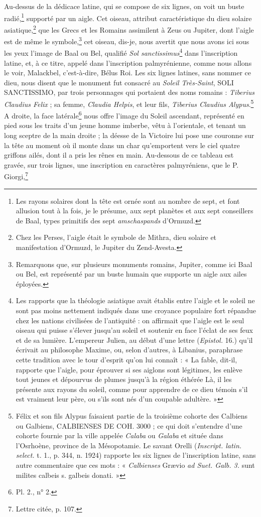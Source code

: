 \documentclass{article}
\begin{document}
Au-dessus de la dédicace latine, qui se compose de six lignes, on voit un buste radié,\footnote{Les rayons solaires dont la tête est ornée sont au nombre de sept, et font allusion tout à la fois, je le présume, aux sept planètes et aux sept conseillers de Baal, types primitifs des sept \emph{amschaspands} d'Ormuzd.} supporté par un aigle. Cet oiseau, attribut caractéristique du dieu solaire asiatique,\footnote{Chez les Perses, l'aigle était le symbole de Mithra, dieu solaire et manifestation d'Ormuzd, le Jupiter du Zend-Avesta.} que les Grecs et les Romains assimilent à Zeus ou Jupiter, dont l'aigle est de même le symbole,\footnote{Remarquons que, sur plusieurs monuments romains, Jupiter, comme ici Baal ou Bel, est représenté par un buste humain que supporte un aigle aux ailes éployées.} cet oiseau, dis-je, nous avertit que nous avons ici sous les yeux l'image de Baal ou Bel, qualifié \emph{Sol sanctissimus}\footnote{Les rapports que la théologie asiatique avait établis entre l'aigle et le soleil ne sont pas moins nettement indiqués dans une croyance populaire fort répandue chez les nations civilisées de l'antiquité : on affirmait que l'aigle est le seul oiseau qui puisse s'élever jusqu'au soleil et soutenir en face l'éclat de ses feux et de sa lumière. L'empereur Julien, au début d'une lettre (\emph{Epistol.} 16.) qu'il écrivait au philosophe Maxime, ou, selon d'autres, à Libanius, paraphrase cette tradition avec le tour d'esprit qu'on lui connaît : « La fable, dit-il, rapporte que l'aigle, pour éprouver si ses aiglons sont légitimes, les enlève tout jeunes et dépourvus de plumes jusqu'à la région éthérée Là, il les présente aux rayons du soleil, comme pour apprendre de ce dieu témoin s'il est vraiment leur père, ou s'ils sont nés d'un coupable adultère. »} dans l'inscription latine, et, à ce titre, appelé dans l'inscription palmyrénienne, comme nous allons le voir, Malackbel, c'est-à-dire, Bélus Roi. Les six lignes latines, sans nommer ce dieu, nous disent que le monument fut consacré au \emph{Soleil Très-Saint}, SOLI SANCTISSIMO, par trois personnages qui portaient des noms romains : \emph{Tiberius Claudius Felix} ; sa femme, \emph{Claudia Helpis}, et leur fils, \emph{Tiberius Claudius Alypus}.\footnote{Félix et son fils Alypus faisaient partie de la troisième cohorte des Calbiens ou Galbiens, CALBIENSES DE COH. 3000 ; ce qui doit s'entendre d'une cohorte fournie par la ville appelée \emph{Calaba} ou \emph{Galaba} et située dans l'Osrhoène, province de la Mésopotamie. Le savant Orelli (\emph{Inscript. latin. select.} t. 1., p. 344, n. 1924) rapporte les six lignes de l'inscription latine, sans autre commentaire que ces mots : « \emph{Calbienses} Grævio \emph{ad Suet. Galb. 3.} sunt milites calbeis s. galbeis donati. »} A droite, la face latérale\footnote{Pl. 2., n° 2.} nous offre l'image du Soleil ascendant, représenté en pied sous les traits d'un jeune homme imberbe, vêtu à l'orientale, et tenant un long sceptre de la main droite ; la déesse de la Victoire lui pose une couronne sur la tête au moment où il monte dans un char qu'emportent vers le ciel quatre griffons ailés, dont il a pris les rênes en main. Au-dessous de ce tableau est gravée, sur trois lignes, une inscription en caractères palmyréniens, que le P. Giorgi,\footnote{Lettre citée, p. 107.} 
\end{document}
